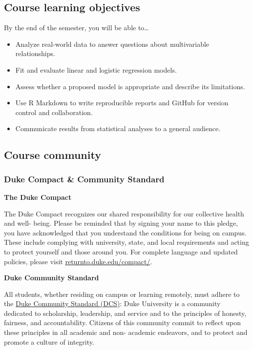\documentclass[
]{article}
\providecommand{\tightlist}{%
  \setlength{\itemsep}{0pt}\setlength{\parskip}{0pt}}
\begin{document}
\hypertarget{course-learning-objectives}{%
\subsection{Course learning
objectives}\label{course-learning-objectives}}

By the end of the semester, you will be able to\ldots{}

\begin{itemize}
\tightlist
\item
  Analyze real-world data to answer questions about multivariable
  relationships.
\item
  Fit and evaluate linear and logistic regression models.
\item
  Assess whether a proposed model is appropriate and describe its
  limitations.
\item
  Use R Markdown to write reproducible reports and GitHub for version
  control and collaboration.
\item
  Communicate results from statistical analyses to a general audience.
\end{itemize}

\hypertarget{course-community}{%
\subsection{Course community}\label{course-community}}

\hypertarget{duke-compact-community-standard}{%
\subsubsection{Duke Compact \& Community
Standard}\label{duke-compact-community-standard}}

\textbf{The Duke Compact}

The Duke Compact recognizes our shared responsibility for our collective
health and well- being. Please be reminded that by signing your name to
this pledge, you have acknowledged that you understand the conditions
for being on campus. These include complying with university, state, and
local requirements and acting to protect yourself and those around you.
For complete language and updated policies, please visit
\href{https://returnto.duke.edu/compact/}{returnto.duke.edu/compact/}.

\textbf{Duke Community Standard}

All students, whether residing on campus or learning remotely, must
adhere to the
\href{https://trinity.duke.edu/undergraduate/academic-policies/community-standard-student-conduct}{Duke
Community Standard (DCS)}: Duke University is a community dedicated to
scholarship, leadership, and service and to the principles of honesty,
fairness, and accountability. Citizens of this community commit to
reflect upon these principles in all academic and non- academic
endeavors, and to protect and promote a culture of integrity.
\end{document}
